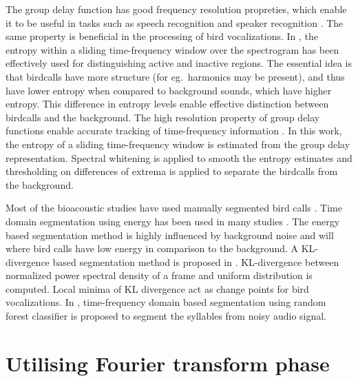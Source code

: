 \documentclass[a4paper]{article}
\begin{document}
The group delay function has good frequency resolution propreties, which enable
it to be useful in tasks such as speech recognition and speaker recognition
\cite{hema} \cite{padman} \cite{modgdf}. The same property is beneficial in the processing of bird
vocalizations. In \cite{wang2013}, the entropy within a sliding time-frequency
window over the spectrogram has been effectively used for distinguishing active
and inactive regions. The essential idea is that birdcalls have more structure
(for eg.~harmonics may be present), and thus have lower entropy when compared to
 background sounds, which have higher entropy. This difference in entropy
levels enable effective distinction between birdcalls and the background.
The high resolution property of group delay functions enable accurate tracking
of time-frequency information \cite{padman}. In this work, the entropy of a sliding
time-frequency window is estimated from the group delay representation. Spectral
whitening is applied to smooth the entropy estimates and thresholding on differences of extrema is
applied to separate the birdcalls from the background.

Most of the bioacoustic studies have used manually segmented bird calls \cite{Trifa} \cite{Lee} \cite{Kaewtip}. Time domain segmentation using energy has been used in many studies \cite{Harma} \cite{Somervuo} \cite{Fagerlund} . The energy  based segmentation method is highly influenced by background noise and will  where bird calls have low energy in comparison to the background. A KL-divergence based segmentation method   is proposed in \cite{Lakshmi}.  KL-divergence between normalized power spectral density of a frame and uniform distribution is computed. Local minima of KL divergence act as change points for bird vocalizations. In \cite{Neal} , time-frequency domain based segmentation using random forest classifier is proposed to segment the syllables from noisy audio signal. 





\section{Utilising Fourier transform phase}
\end{document}
